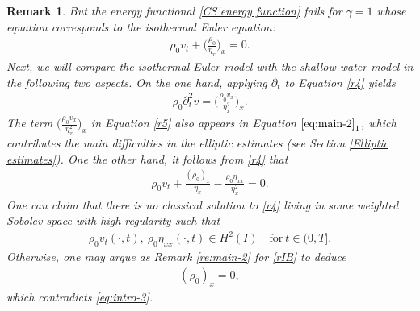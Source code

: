 \documentclass[11pt, reqno]{amsart}
\newtheorem{remark}{Remark}
\numberwithin{equation}{section}
\begin{document}
\begin{remark}
But the energy functional \eqref{CS'energy function} fails for \(\gamma=1\) whose equation corresponds to the isothermal Euler equation:
\begin{align}\label{r4}
	\rho_0v_t+\bigg({\frac{\rho_0}{\eta_x}}\bigg)_x
	=0.
\end{align}
Next, we will compare the isothermal Euler model with the shallow water model in the following two aspects. On the one hand, applying 
\(\partial_t\) to Equation \eqref{r4} yields
\begin{align}\label{r5}
	\rho_0\partial_t^2v=\bigg({\frac{\rho_0v_x}{\eta_x^2}}\bigg)_x.
\end{align}
The term \(\big({\frac{\rho_0v_x}{\eta_x^2}}\big)_x\) in Equation \eqref{r5} also appears in Equation \(\eqref{eq:main-2}_1\), which contributes the main difficulties in the elliptic estimates (see Section \ref{Elliptic estimates}).
One the other hand, it follows from \eqref{r4} that
\begin{align}\label{rIB}
	\rho_0v_t+{\frac{(\rho_0)_x}{\eta_x}}-{\frac{\rho_0\eta_{xx}}{\eta_x^2}}=0.
\end{align}
One can claim that there is no classical solution to \eqref{r4} living in some weighted Sobolev space with high regularity such that
\begin{align*}
	\rho_0v_t(\cdot, t),\ \rho_0\eta_{xx}(\cdot, t)\in H^2(I)\quad  \text{for}\ t\in (0,T].
\end{align*} 
Otherwise, one may argue as Remark \ref{re:main-2} for \eqref{rIB} to deduce
\begin{align*}
	(\rho_0)_x=0,
\end{align*} 
which contradicts \eqref{eq:intro-3}. 



\end{remark}
\end{document}
